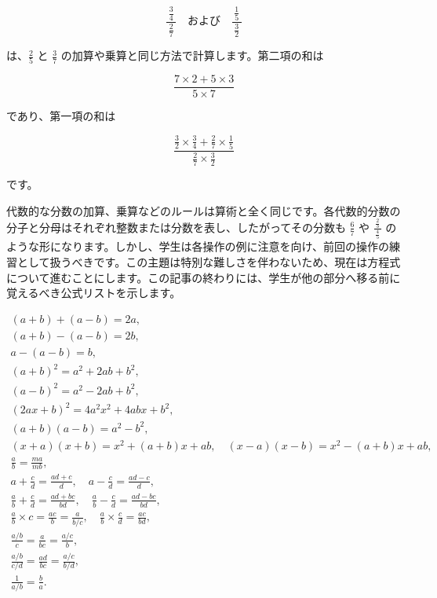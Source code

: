 \documentclass[a4paper,11pt,openany]{ltjsbook}
\begin{document}
\[
\frac{\,\frac{3}{4}\,}{\frac{2}{7}} \quad \text{および} \quad \frac{\,\frac{1}{5}\,}{\frac{3}{2}}
\]

は、\(\frac{2}{5}\) と \(\frac{3}{7}\) の加算や乗算と同じ方法で計算します。第二項の和は

\[
\frac{7 × 2 + 5 × 3}{5 × 7}
\]

であり、第一項の和は

\[
\frac{\frac{3}{2} × \frac{3}{4} + \frac{2}{7} × \frac{1}{5}}{\frac{2}{7} × \frac{3}{2}}
\]

です。

代数的な分数の加算、乗算などのルールは算術と全く同じです。各代数的分数の分子と分母はそれぞれ整数または分数を表し、したがってその分数も \(\frac{6}{7}\) や \(\frac{\,\frac{2}{3}\,}{\frac{4}{5}}\) のような形になります。しかし、学生は各操作の例に注意を向け、前回の操作の練習として扱うべきです。この主題は特別な難しさを伴わないため、現在は方程式について進むことにします。この記事の終わりには、学生が他の部分へ移る前に覚えるべき公式リストを示します。

\begin{gather*}
(a + b) + (a - b) = 2a, \tag{1}\\
(a + b) - (a - b) = 2b, \tag{2}\\
a - (a - b) = b, \tag{3}\\
(a + b)^2 = a^2 + 2ab + b^2, \tag{4}\\
(a - b)^2 = a^2 - 2ab + b^2, \tag{5}\\
(2ax + b)^2 = 4a^2x^2 + 4abx + b^2, \tag{6}\\
(a + b)(a - b) = a^2 - b^2, \tag{7}\\
(x + a)(x + b) = x^2 + (a + b)x + ab, \quad (x - a)(x - b) = x^2 - (a + b)x + ab, \tag{8}\\
\frac{a}{b} = \frac{ma}{mb}, \tag{9}\\
a + \frac{c}{d} = \frac{ad + c}{d}, \quad a - \frac{c}{d} = \frac{ad - c}{d}, \tag{10}\\
\frac{a}{b} + \frac{c}{d} = \frac{ad + bc}{bd}, \quad \frac{a}{b} - \frac{c}{d} = \frac{ad - bc}{bd}, \tag{11}\\
\frac{a}{b} \times c = \frac{ac}{b} = \frac{a}{b/c}, \quad \frac{a}{b} \times \frac{c}{d} = \frac{ac}{bd}, \tag{12}\\
\frac{a/b}{c} = \frac{a}{bc} = \frac{a/c}{b}, \tag{13}\\
\frac{a/b}{c/d} = \frac{ad}{bc} = \frac{a/c}{b/d}, \tag{14}\\
\frac{1}{a/b} = \frac{b}{a}. \tag{15}
\end{gather*}
\end{document}
